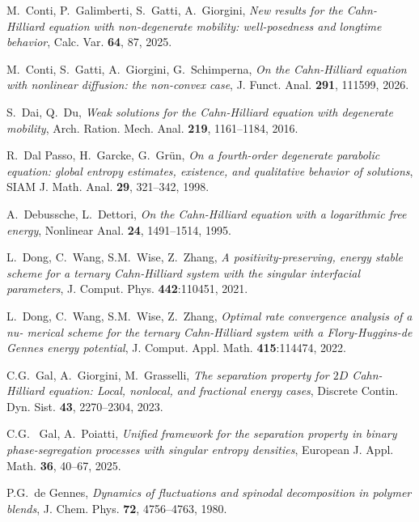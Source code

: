\documentclass[11pt,  reqno]{amsart}%
\theoremstyle{plain}
\theoremstyle{definition}
\theoremstyle{remark}
\numberwithin{equation}{section}
\begin{document}
\begin{thebibliography}{}
     M.~Conti, P.~Galimberti, S.~Gatti, A.~Giorgini, 
    \textit{New results for the {C}ahn-{H}illiard equation with non-degenerate mobility: well-posedness and longtime behavior}, Calc. Var. \textbf{64}, 87, 2025.

     M.~Conti, S.~Gatti, A.~Giorgini, G.~Schimperna,
    \textit{On the {C}ahn-{H}illiard equation with nonlinear diffusion: the non-convex case}, J. Funct. Anal. \textbf{291}, 111599, 2026.

    S.~Dai, Q.~Du,
    \textit{Weak solutions for the {C}ahn-{H}illiard equation with degenerate mobility},
     Arch. Ration. Mech. Anal. \textbf{219}, 1161--1184, 2016.


    R.~Dal Passo, H.~Garcke, G.~Gr\"un,
    \textit{On a fourth-order degenerate parabolic equation: global entropy estimates, existence, and qualitative behavior of solutions}, SIAM J. Math. Anal. \textbf{29}, 321--342, 1998.


 A.~Debussche, L.~Dettori,
    \textit{On the {C}ahn-{H}illiard equation with a logarithmic free energy}, Nonlinear Anal. \textbf{24}, 1491--1514, 1995.

L.~Dong, C.~Wang, S.M.~Wise, Z.~Zhang, 
\textit{A positivity-preserving, energy stable scheme for a ternary {C}ahn-{H}illiard system with the singular interfacial parameters}, 
J. Comput. Phys. \textbf{442}:110451, 2021.

L.~Dong, C.~Wang, S.M.~Wise, Z.~Zhang, 
\textit{Optimal rate convergence analysis of a nu- merical scheme for the ternary {C}ahn-{H}illiard system with a {F}lory-{H}uggins-de {G}ennes energy potential}, 
J. Comput. Appl. Math. \textbf{415}:114474, 2022.

    C.G.~Gal, A.~Giorgini, M.~Grasselli,
    \textit{The separation property for $2D$ {C}ahn-{H}illiard equation: Local, nonlocal, and fractional energy cases}, 
    Discrete Contin. Dyn. Sist. \textbf{43}, 2270--2304, 2023.

    C.G. ~Gal, A.~Poiatti,
    \textit{Unified framework for the separation property in binary phase-segregation processes with singular entropy densities}, European J. Appl. Math. \textbf{36}, 40--67, 2025.

    P.G.~de Gennes,
    \textit{Dynamics of fluctuations and spinodal decomposition in polymer blends}, 
    J. Chem. Phys. \textbf{72}, 4756--4763, 1980.


\end{thebibliography}
\end{document}
